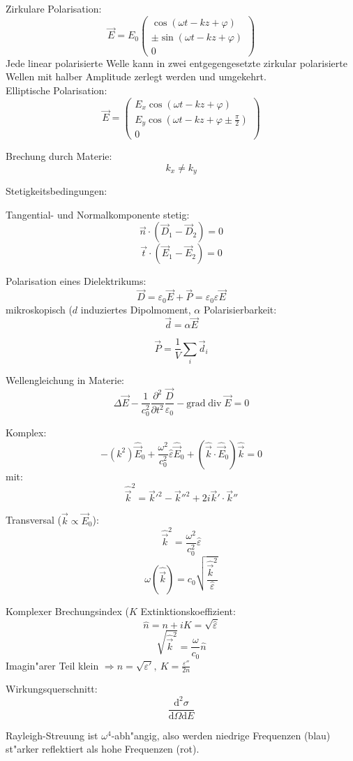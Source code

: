 \documentclass[12pt]{report}
\newcommand{\vepsilon}{\varepsilon}
\newcommand{\vphi}{\varphi}
\newcommand{\dd}{\mathrm{d}}
\begin{document}
Zirkulare Polarisation:
\[\vec{E}=E_0\begin{pmatrix}\cos(\omega t-kz+\vphi)\\\pm\sin(\omega t-kz+\vphi)\\0\end{pmatrix}\]
Jede linear polarisierte Welle kann in zwei entgegengesetzte zirkular polarisierte Wellen mit halber Amplitude zerlegt werden und umgekehrt.\\

Elliptische Polarisation:
\[\vec{E}=\begin{pmatrix}E_x\cos(\omega t-kz+\vphi)\\E_y\cos(\omega t-kz+\vphi\pm\frac{\pi}{2})\\0\end{pmatrix}\]

Brechung durch Materie:
\[k_x\neq k_y\]

Stetigkeitsbedingungen:

Tangential- und Normalkomponente stetig:
\[\vec{n}\cdot(\vec{D}_1-\vec{D}_2)=0\]
\[\vec{t}\cdot(\vec{E}_1-\vec{E}_2)=0\]

Polarisation eines Dielektrikums:
\[\vec{D}=\vepsilon_0\vec{E}+\vec{P}=\vepsilon_0\vepsilon\vec{E}\]
mikroskopisch ($d$ induziertes Dipolmoment, $\alpha$ Polarisierbarkeit:
\[\vec{d}=\alpha\vec{E}\]

\[\vec{P}=\frac{1}{V}\sum_i\vec{d}_i\]

Wellengleichung in Materie:
\[\Delta\vec{E}-\frac{1}{c_0^2}\frac{\partial^2}{\partial t^2}\frac{\vec{D}}{\vepsilon_0}-\mathrm{grad}\mathop\mathrm{div}\vec{E}=0\]

Komplex:
\[-(k^2)\hat{\vec{E}}_0+\frac{\omega^2}{c_0^2}\hat{\vepsilon}\hat{\vec{E}}_0+(\hat{\vec{k}}\cdot\hat{\vec{E}}_0)\hat{\vec{k}}=0\]
mit:
\[\hat{\vec{k}}^2=\vec{k}'^2-\vec{k}''^2+2i\vec{k}'\cdot\vec{k}''\]

Transversal ($\vec{k}\propto\vec{E}_0$):
\[\hat{\vec{k}}^2=\frac{\omega^2}{c_0^2}\hat{\vepsilon}\]
\[\omega(\hat{\vec{k}})=c_0\sqrt{\frac{\hat{\vec{k}}^2}{\hat{\vepsilon}}}\]

Komplexer Brechungsindex ($K$ Extinktionskoeffizient:
\[\hat{n}=n+iK=\sqrt{\hat{\vepsilon}}\]
\[\sqrt{\hat{\vec{k}}^2}=\frac{\omega}{c_0}\hat{n}\]
Imagin"arer Teil klein $\Rightarrow n=\sqrt{\vepsilon'},\ K=\frac{\vepsilon''}{2n}$

Wirkungsquerschnitt:
\[\frac{\dd^2\sigma}{\dd\Omega\dd E}\]

Rayleigh-Streuung ist $\omega^4$-abh"angig, also werden niedrige Frequenzen (blau) st"arker reflektiert als hohe Frequenzen (rot).
\end{document}
